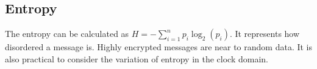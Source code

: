 \subsection{Entropy}
\begin{frame}
    The entropy can be calculated as $H = -\sum_{i=1}^{n} p_i \log_2(p_i)$. It represents how disordered a message is. Highly encrypted messages are near to random data.
    It is also practical to consider the variation of entropy in the clock domain.
    \begin{table}[h]
    \centering
    \caption{Average entropy for common protocols}
    \end{table}
\end{frame}

